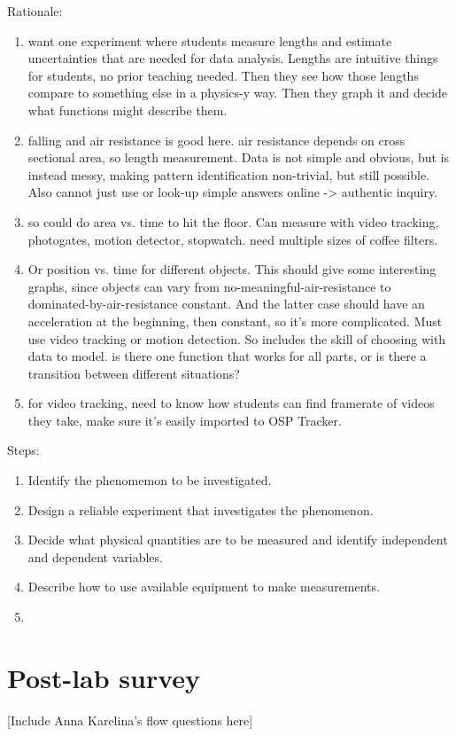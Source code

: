 Rationale:
\begin{enumerate}
 \item want one experiment where students measure lengths and estimate uncertainties that are needed for data analysis. Lengths are intuitive things for students, no prior teaching needed. Then they see how those lengths compare to something else in a physics-y way. Then they graph it and decide what functions might describe them.
 
 \item falling and air resistance is good here. air resistance depends on cross sectional area, so length measurement. Data is not simple and obvious, but is instead messy, making pattern identification non-trivial, but still possible. Also cannot just use or look-up simple answers online -> authentic inquiry.
 
 \item so could do area vs. time to hit the floor. Can measure with video tracking, photogates, motion detector, stopwatch. need multiple sizes of coffee filters.
 
 \item Or position vs. time for different objects. This should give some interesting graphs, since objects can vary from no-meaningful-air-resistance to dominated-by-air-resistance constant. And the latter case should have an acceleration at the beginning, then constant, so it's more complicated. Must use video tracking or motion detection. So includes the skill of choosing with data to model. is there one function that works for all parts, or is there a transition between different situations?
 
 \item for video tracking, need to know how students can find framerate of videos they take, make sure it's easily imported to OSP Tracker.
\end{enumerate}

Steps:
\begin{enumerate}
 \item Identify the phenomemon to be investigated.
 
 \item Design a reliable experiment that investigates the phenomenon.
 
 \item Decide what physical quantities are to be measured and identify independent and dependent variables.
 
 \item Describe how to use available equipment to make measurements.
 
 \item 
\end{enumerate}

\section{Post-lab survey}

[Include Anna Karelina's flow questions here]